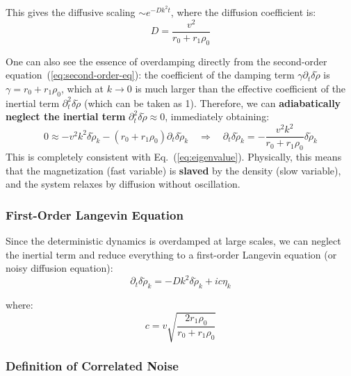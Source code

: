 This gives the diffusive scaling $\sim e^{-Dk^2t}$, where the diffusion coefficient is:
\begin{equation}\label{eq:diffusivity}
\boxed{D = \frac{v^2}{r_0 + r_1\rho_0}}
\end{equation}

\begin{remark}
One can also see the essence of overdamping directly from the second-order equation~(\ref{eq:second-order-eq}): the coefficient of the damping term $\gamma\partial_t\delta\tilde{\rho}$ is $\gamma = r_0 + r_1\rho_0$, which at $k \to 0$ is much larger than the effective coefficient of the inertial term $\partial_t^2\delta\tilde{\rho}$ (which can be taken as 1). Therefore, we can \textbf{adiabatically neglect the inertial term} $\partial_t^2\delta\tilde{\rho} \approx 0$, immediately obtaining:
\[
0 \approx -v^2 k^2 \delta\tilde{\rho}_k - (r_0 + r_1\rho_0)\partial_t\delta\tilde{\rho}_k
\quad\Longrightarrow\quad
\partial_t\delta\tilde{\rho}_k = -\frac{v^2 k^2}{r_0 + r_1\rho_0}\delta\tilde{\rho}_k
\]
This is completely consistent with Eq.~(\ref{eq:eigenvalue}). Physically, this means that the magnetization (fast variable) is \textbf{slaved} by the density (slow variable), and the system relaxes by diffusion without oscillation.
\end{remark}

\subsubsection{First-Order Langevin Equation}

Since the deterministic dynamics is overdamped at large scales, we can neglect the inertial term and reduce everything to a first-order Langevin equation (or noisy diffusion equation):
\begin{equation}\label{eq:first-order-langevin}
\partial_t \delta\tilde{\rho}_k = -Dk^2\delta\tilde{\rho}_k + ic\eta_k
\end{equation}

where:
\begin{equation}\label{eq:noise-strength}
c = v\sqrt{\frac{2r_1\rho_0}{r_0 + r_1\rho_0}}
\end{equation}

\subsubsection{Definition of Correlated Noise}

